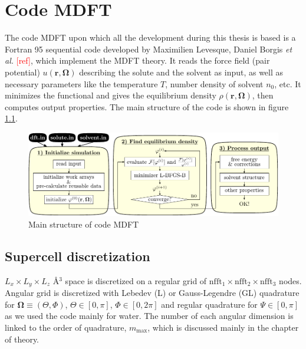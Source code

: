 
\chapter{Code MDFT\label{chpt:mdft}}

The code MDFT upon which all the development during this thesis is
based is a Fortran 95 sequential code developed by Maximilien Levesque,
Daniel Borgis \textit{et al.} \textcolor{red}{{[}ref{]}}, which implement
the \acs{MDFT} theory. It reads the force field (pair potential)
$u(\mathbf{r},\mathbf{\Omega})$ describing the solute and the solvent
as input, as well as necessary parameters like the temperature $T$,
number density of solvent $n_{0}$, etc. It minimizes the functional
and gives the equilibrium density $\rho(\mathbf{r},\mathbf{\Omega})$,
then computes output properties. The main structure of the code is
shown in figure \ref{fig:code-mdft}.

\begin{figure}[h]
\begin{centering}
\includegraphics[width=1\columnwidth]{_figure/mdft}
\par\end{centering}
\caption{Main structure of code MDFT\label{fig:code-mdft}}
\end{figure}


\section{Supercell discretization}

$L_{x}\times L_{y}\times L_{z}$ Å$^{3}$ space is discretized on
a regular grid of $\textrm{nfft}_{1}\times\textrm{nfft}_{2}\times\textrm{nfft}_{3}$
nodes. Angular grid is discretized with Lebedev (L) or Gauss-Legendre
(GL) quadrature for $\mathbf{\Omega}\equiv\left(\Theta,\Phi\right)$,
$\Theta\in\left[0,\pi\right]$, $\Phi\in\left[0,2\pi\right]$ and
regular quadrature for $\Psi\in\left[0,\pi\right]$ as we used the
code mainly for water. The number of each angular dimension is linked
to the order of quadrature, $m_{\max}$, which is discussed mainly
in the chapter of theory.

